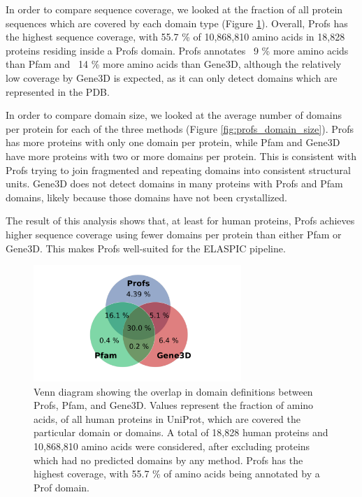In order to compare sequence coverage, we looked at the fraction of all protein sequences which are covered by each domain type (Figure \ref{fig:profs_coverage}). Overall, Profs has the highest sequence coverage, with 55.7 \% of 10,868,810 amino acids in 18,828 proteins residing inside a Profs domain. Profs annotates ~9 \% more amino acids than Pfam and ~14 \% more amino acids than Gene3D, although the relatively low coverage by Gene3D is expected, as it can only detect domains which are represented in the PDB.

In order to compare domain size, we looked at the average number of domains per protein for each of the three methods (Figure \ref{fig:profs_domain_size}). Profs has more proteins with only one domain per protein, while Pfam and Gene3D have more proteins with two or more domains per protein. This is consistent with Profs trying to join fragmented and repeating domains into consistent structural units. Gene3D does not detect domains in many proteins with Profs and Pfam domains, likely because those domains have not been crystallized.

The result of this analysis shows that, at least for human proteins, Profs achieves higher sequence coverage using fewer domains per protein than either Pfam or Gene3D. This makes Profs well-suited for the ELASPIC pipeline.


\begin{figure}[!tb]
	\centering
	\includegraphics[width=0.7\textwidth]{static/profs/uniprot_coverage_statistics.pdf}
	\caption[Profs, Pfam, and Gene3D domain overlap.]{Venn diagram showing the overlap in domain definitions between Profs, Pfam, and Gene3D. Values represent the fraction of amino acids, of all human proteins in UniProt, which are covered the particular domain or domains. A total of 18,828 human proteins and 10,868,810 amino acids were considered, after excluding proteins which had no predicted domains by any method. Profs has the highest coverage, with 55.7 \% of amino acids being annotated by a Prof domain.}
	\label{fig:profs_coverage}
\end{figure}



